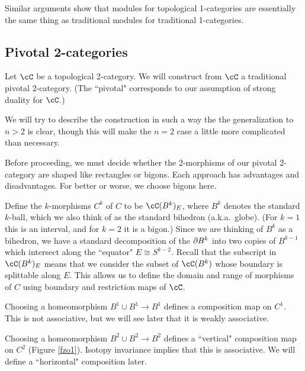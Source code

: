 \medskip

Similar arguments show that modules for topological 1-categories are essentially
the same thing as traditional modules for traditional 1-categories.


\subsection{Pivotal 2-categories}
\label{ssec:2-cats}
Let $\cC$ be a topological 2-category.
We will construct from $\cC$ a traditional pivotal 2-category.
(The ``pivotal" corresponds to our assumption of strong duality for $\cC$.)

We will try to describe the construction in such a way the the generalization to $n>2$ is clear,
though this will make the $n=2$ case a little more complicated than necessary.

Before proceeding, we must decide whether the 2-morphisms of our
pivotal 2-category are shaped like rectangles or bigons.
Each approach has advantages and disadvantages.
For better or worse, we choose bigons here.

Define the $k$-morphisms $C^k$ of $C$ to be $\cC(B^k)_E$, where $B^k$ denotes the standard
$k$-ball, which we also think of as the standard bihedron (a.k.a.\ globe).
(For $k=1$ this is an interval, and for $k=2$ it is a bigon.)
Since we are thinking of $B^k$ as a bihedron, we have a standard decomposition of the $\partial B^k$
into two copies of $B^{k-1}$ which intersect along the ``equator" $E \cong S^{k-2}$.
Recall that the subscript in $\cC(B^k)_E$ means that we consider the subset of $\cC(B^k)$
whose boundary is splittable along $E$.
This allows us to define the domain and range of morphisms of $C$ using
boundary and restriction maps of $\cC$.

Choosing a homeomorphism $B^1\cup B^1 \to B^1$ defines a composition map on $C^1$.
This is not associative, but we will see later that it is weakly associative.

Choosing a homeomorphism $B^2\cup B^2 \to B^2$ defines a ``vertical" composition map 
on $C^2$ (Figure \ref{fzo1}).
Isotopy invariance implies that this is associative.
We will define a ``horizontal" composition later.

